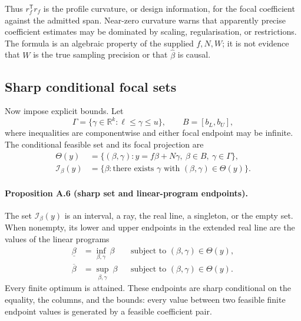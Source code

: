 Thus \(r_f^{\mathsf T}r_f\) is the profile curvature, or design information,
for the focal coefficient against the admitted span. Near-zero curvature
warns that apparently precise coefficient estimates may be dominated by
scaling, regularisation, or restrictions. The formula is an algebraic
property of the supplied \(f,N,W\); it is not evidence that \(W\) is the true
sampling precision or that \(\widehat\beta\) is causal.

\subsection{Sharp conditional focal sets}
\label{app:sharp-set}

Now impose explicit bounds. Let
\begin{equation}
  \Gamma=\{\gamma\in\mathbb R^k:\ell\leq\gamma\leq u\},
  \qquad
  B=[b_L,b_U],
  \label{eq:box-sets}
\end{equation}
where inequalities are componentwise and either focal endpoint may be
infinite. The conditional feasible set and its focal projection are
\begin{align}
  \Theta(y)
    &=\{(\beta,\gamma):
          y=f\beta+N\gamma,\ \beta\in B,\ \gamma\in\Gamma\},
    \label{eq:conditional-feasible-set}\\
  \mathcal I_\beta(y)
    &=\{\beta:\text{there exists }\gamma
          \text{ with }(\beta,\gamma)\in\Theta(y)\}.
    \label{eq:focal-identified-set}
\end{align}

\paragraph{Proposition A.6 (sharp set and linear-program endpoints).}
The set \(\mathcal I_\beta(y)\) is an interval, a ray, the real line, a
singleton, or the empty set. When nonempty, its lower and upper endpoints in
the extended real line are the values of the linear programs
\begin{align}
  \underline\beta
    &=\inf_{\beta,\gamma}\ \beta
      &&\text{subject to }(\beta,\gamma)\in\Theta(y),
    \label{eq:lower-lp}\\
  \overline\beta
    &=\sup_{\beta,\gamma}\ \beta
      &&\text{subject to }(\beta,\gamma)\in\Theta(y).
    \label{eq:upper-lp}
\end{align}
Every finite optimum is attained. These endpoints are sharp conditional on
the equality, the columns, and the bounds: every value between two feasible
finite endpoint values is generated by a feasible coefficient pair.

